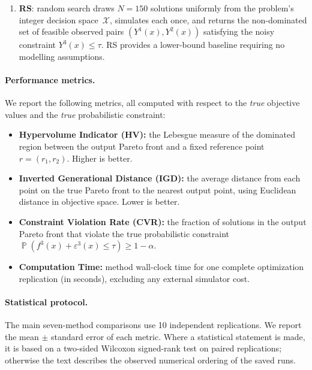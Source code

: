 \documentclass[12pt]{article}
\theoremstyle{plain}
\theoremstyle{definition}
\theoremstyle{remark}
\DeclareMathOperator{\Prob}{\mathbb{P}}
\begin{document}
\begin{enumerate}[label=(\arabic*),leftmargin=2.5em]
  \item \textbf{RS}: random search draws $N=150$ solutions uniformly from
    the problem's integer decision space~$\mathcal{X}$, simulates each once,
    and returns the non-dominated set of feasible observed pairs
    $(Y^1(x),Y^2(x))$ satisfying the noisy constraint $Y^3(x)\le\tau$.
    RS provides a lower-bound baseline requiring no modelling assumptions.

\end{enumerate}

\paragraph{Performance metrics.}
We report the following metrics, all computed with respect to the
\emph{true} objective values and the \emph{true} probabilistic constraint:
\begin{itemize}[leftmargin=2em]
  \item \textbf{Hypervolume Indicator (HV):} the Lebesgue measure of the
    dominated region between the output Pareto front and a fixed reference
    point $r=(r_{1},r_{2})$.  Higher is better.
  \item \textbf{Inverted Generational Distance (IGD):} the average
    distance from each point on the true Pareto front to the nearest
    output point, using Euclidean distance in objective space.  Lower is
    better.
  \item \textbf{Constraint Violation Rate (CVR):} the fraction of
    solutions in the output Pareto front that violate the true
    probabilistic constraint $\Prob(f^{3}(x)+\varepsilon^{3}(x)\le\tau)
    \ge 1-\alpha$.
  \item \textbf{Computation Time:} method wall-clock time for one
    complete optimization replication (in seconds), excluding any
    external simulator cost.
\end{itemize}

\paragraph{Statistical protocol.}
The main seven-method comparisons use 10 independent replications.
We report the mean $\pm$ standard error of each metric.  Where a
statistical statement is made, it is based on a two-sided Wilcoxon
signed-rank test on paired replications; otherwise the text describes
the observed numerical ordering of the saved runs.
\end{document}
